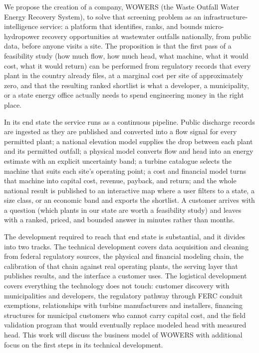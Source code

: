 \documentclass[12pt,letterpaper]{report}
\begin{document}
We propose the creation of a company, WOWERS (the Waste Outfall Water Energy
Recovery System), to solve that screening problem as an
infrastructure-intelligence service: a platform that identifies, ranks, and bounds
micro-hydropower recovery opportunities at wastewater outfalls nationally, from
public data, before anyone visits a site. The proposition is that the first
pass of a feasibility study (how much flow, how much head, what machine, what
it would cost, what it would return) can be performed from regulatory records
that every plant in the country already files, at a marginal cost per site of
approximately zero, and that the resulting ranked shortlist is what a developer, a
municipality, or a state energy office actually needs to spend
engineering money in the right place.

In its end state the service runs as a continuous pipeline. Public discharge
records are ingested as they are published and converted into a flow signal for
every permitted plant; a national elevation model supplies the drop between each
plant and its permitted outfall; a physical model converts flow and head into an
energy estimate with an explicit uncertainty band; a turbine catalogue selects the
machine that suits each site's operating point; a cost and financial model turns
that machine into capital cost, revenue, payback, and return; and the whole
national result is published to an interactive map where a user filters to a
state, a size class, or an economic band and exports the shortlist. A customer
arrives with a question (which plants in our state are worth a feasibility
study) and leaves with a ranked, priced, and bounded answer in minutes rather
than months.

The development required to reach that end state is substantial, and it divides
into two tracks. The technical development covers data acquisition and cleaning
from federal regulatory sources, the physical and financial modeling chain, the
calibration of that chain against real operating plants, the serving layer that
publishes results, and the interface a customer uses. The logistical development
covers everything the technology does not touch: customer discovery with
municipalities and developers, the regulatory pathway through FERC conduit
exemptions, relationships with turbine manufacturers and installers, financing
structures for municipal customers who cannot carry capital cost, and the field
validation program that would eventually replace modeled head with measured
head. This work will discuss the business model of WOWERS with additional focus on
the first steps in its technical development.
\end{document}
